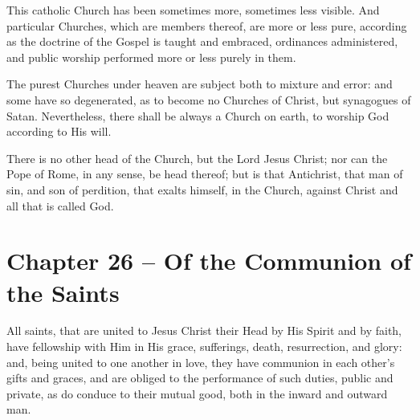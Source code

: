 \begin{outerlst}[left=0pt,labelsep=0pt]
\begin{innerlst}[resume*]
\item This catholic Church has been sometimes more, sometimes less visible. And particular Churches, which are members thereof, are more or less pure, according as the doctrine of the Gospel is taught and embraced, ordinances administered, and public worship performed more or less purely in them.   

\item The purest Churches under heaven are subject both to mixture and error: and some have so degenerated, as to become no Churches of Christ, but synagogues of Satan. Nevertheless, there shall be always a Church on earth, to worship God according to His will.   

\item There is no other head of the Church, but the Lord Jesus Christ; nor can the Pope of Rome, in any sense, be head thereof; but is that Antichrist, that man of sin, and son of perdition, that exalts himself, in the Church, against Christ and all that is called God.  
\end{innerlst}

\item
{}
\section{Chapter 26 -- Of the Communion of the Saints}
\begin{innerlst}[resume*]

\item All saints, that are united to Jesus Christ their Head by His Spirit and by faith, have fellowship with Him in His grace, sufferings, death, resurrection, and glory: and, being united to one another in love, they have communion in each other's gifts and graces, and are obliged to the performance of such duties, public and private, as do conduce to their mutual good, both in the inward and outward man.   


\end{innerlst}
\end{outerlst}
